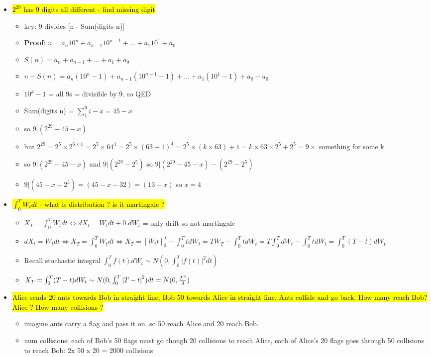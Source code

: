 \documentclass[10pt,landscape,a4paper]{article}
\begin{document}
\begin{multicols*}{4}
\begin{spacing}{0.1}
\begin{itemize}
\item \hl{$2^{29}$ has 9 digits all different - find missing digit}
\begin{itemize}
\item key: 9 divides [n - Sum(digits n)]
\item \textbf{Proof}: $n=a_n 10^n + a_{n-1} 10^{n-1}+ \ldots + a_{1} 10^{1} + a_0 $
\item $S(n)=a_n + a_{n-1}+ \ldots + a_{1} + a_0 $
\item $n-S(n)=a_n (10^n-1) + a_{n-1} (10^{n-1}-1)+ \ldots + a_{1} (10^1-1) + a_0-a_0 $
\item $10^k-1$ = all 9s = divisible by 9. so  QED
\item Sum(digits n) = $\sum_{1}^{9}i-x=45-x$
\item so $9|(2^{29}-45-x)$ 
\item but $2^{29}=2^5 \times 2^{6 \times 4} = 2^5 \times {64}^4= 2^5 \times {(63+1)}^4=2^5 \times {(k \times 63)+1}=k \times 63 \times 2^5+2^5 = 9 \times$ something for some k
\item so $9|(2^{29}-45-x)$ and $9|(2^{29}-2^5)$ so $9|(2^{29}-45-x)-(2^{29}-2^5)$
\item $9|(45-x-2^5)=(45-x-32)=(13-x)$ so $x=4$
\end{itemize}

\item \hl{$\int_0^T W_t dt$ - what is distribution ? is it martingale ?}
\begin{itemize}
\item $X_T=\int_0^T W_t dt \Leftrightarrow dX_t=W_tdt+0.dW_t$ =  only drift so not martingale
\item $dX_t=W_tdt \Leftrightarrow X_T=\int_0^T W_t dt \Leftrightarrow X_T = [W_tt]_0^T - \int_{0}^{T}tdW_t = TW_T- \int_{0}^{T}tdW_t = T\int_{0}^{T}dW_t - \int_{0}^{T}tdW_t  = \int_{0}^{T} (T-t) dW_t$
\item Recall stochastic integral \colorbox{green!10}{ $\int_0^T f(t)dW_t \sim N(0,\int_{0}^{T}{|f(t)|}^2 dt)$}
\item $X_T=\int_{0}^{T} (T-t) dW_t \sim N(0,\int_0^T {|T-t|}^2)dt=N(0,{T^3 \over 3})$
\end{itemize}

\item \hl{Alice sends 20 ants towards Bob in straight line, Bob 50 towards Alice in straight line. Ants collide and go back. How many reach Bob? Alice ? How many collisions ?}
\begin{itemize}
\item imagine ants carry a flag and pass it on. so 50 reach Alice and 20 reach Bob.
\item num collisions: each of Bob's 50 flags must go though 20 collisions to reach Alice, each of Alice's 20 flags goes through 50 collisions to reach Bob: 2x 50 x 20 = 2000 collisions
\end{itemize}


\end{itemize}
\end{spacing}
\end{multicols*}
\end{document}
